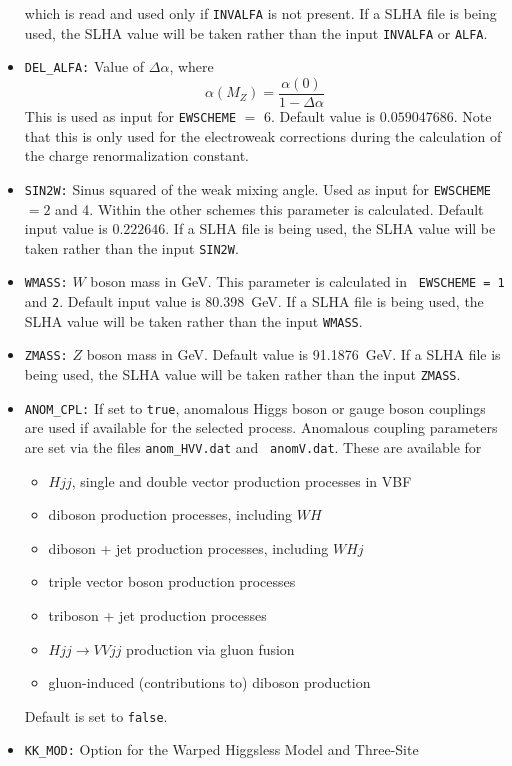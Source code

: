 \documentclass[english,12pt]{article}
\begin{document}
\begin{itemize}
which is read and used only if {\tt INVALFA} is not present. If a SLHA file is
being used, the SLHA value will be taken rather than the input {\tt INVALFA} or
{\tt ALFA}. 
\item {\tt DEL\_ALFA:} Value of $\Delta \alpha$, where
\begin{equation}
 \alpha(M_{Z}) = \frac{\alpha(0)}{1 - \Delta \alpha}
\end{equation}
This is used as input for {\tt EWSCHEME} $=$ 6.  Default value is $0.059047686$.
 Note that this is only used for the electroweak corrections during the
calculation of the charge renormalization constant.
\item {\tt SIN2W:} Sinus squared of the weak mixing angle. Used as input for
  {\tt EWSCHEME} $= 2$ and 4. Within the other schemes this parameter is
  calculated. Default input value is $0.222646$.  If a SLHA file is being used, the SLHA value will be taken rather than the input {\tt SIN2W}.
\item {\tt WMASS:} $W$ boson mass in GeV. This parameter is calculated in {\tt
EWSCHEME = 1} and {\tt 2}.  Default input value is 80.398~GeV.  If a SLHA file is being used, the SLHA value will be taken rather than the input {\tt WMASS}.
\item {\tt ZMASS:} $Z$ boson mass in GeV. Default value is 91.1876~GeV.  If a SLHA file is being used, the SLHA value will be taken rather than the input {\tt ZMASS}.
\item {\tt ANOM\_CPL:} If set to {\tt true}, anomalous Higgs boson or gauge
boson couplings are used if available for the selected process. Anomalous
coupling parameters are set via the files {\tt anom\_HVV.dat} and {\tt
anomV.dat}.  These are available for   
  \begin{itemize}
    \item $Hjj$, single and double vector production processes in VBF 
    \item diboson production processes, including $WH$
    \item diboson + jet production processes, including $WHj$
    \item triple vector boson production processes
    \item triboson + jet production processes
    \item $Hjj \rightarrow VV jj$ production via gluon fusion
    \item gluon-induced (contributions to) diboson production
  \end{itemize}
  Default is set to {\tt false}.
\item {\tt KK\_MOD:} Option for the Warped Higgsless Model and Three-Site

\end{itemize}
\end{document}
